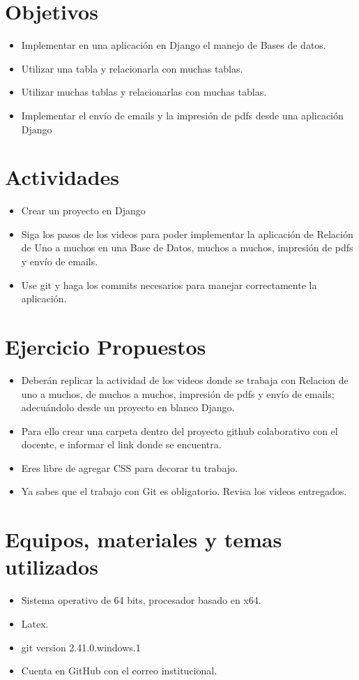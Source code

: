 \documentclass{article}
\begin{document}
\section{Objetivos}
	\begin{itemize}		
		\item Implementar en una aplicación en Django el manejo de Bases de datos.
		\item	Utilizar una tabla y relacionarla con muchas tablas.
		\item Utilizar muchas tablas y relacionarlas con muchas tablas.
		\item Implementar el envío de emails y la impresión de pdfs desde una aplicación Django
	\end{itemize}
\section{Actividades}
	\begin{itemize}		
		\item Crear un proyecto en Django
		\item Siga los pasos de los videos para poder implementar la aplicación de Relación de Uno a muchos en una Base de Datos, muchos a muchos, impresión de pdfs y envío de emails.
		\item Use git y haga los commits necesarios para manejar correctamente la aplicación.
	\end{itemize}
\section{Ejercicio Propuestos}
	\begin{itemize}		
		\item Deberán replicar la actividad de los videos donde se trabaja con Relacion de uno a muchos, de muchos a muchos, impresión de pdfs y envío de emails;  adecuándolo desde un proyecto en blanco Django.
		\item Para ello crear una carpeta dentro del proyecto github colaborativo con el docente, e informar el link donde se encuentra.
		\item	Eres libre de agregar CSS para decorar tu trabajo.
		\item Ya sabes que el trabajo con Git es obligatorio.  Revisa los videos entregados.
	\end{itemize}
\section{Equipos, materiales y temas utilizados}
	\begin{itemize}
		\item Sistema operativo de 64 bits, procesador basado en x64.
		\item Latex. 
		\item git version 2.41.0.windows.1
		\item Cuenta en GitHub con el correo institucional.
	\end{itemize}
\end{document}
